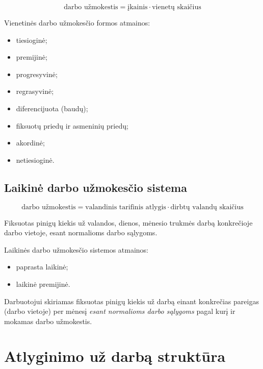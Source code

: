 \begin{equation*}
  \text{darbo užmokestis} = \text{įkainis} \cdot \text{vienetų skaičius}
\end{equation*}

Vienetinės darbo užmokesčio formos atmainos:
\begin{itemize}
  \item tiesioginė;
  \item premijinė;
  \item progresyvinė;
  \item regrasyvinė;
  \item diferencijuota (baudų);
  \item fiksuotų priedų ir asmeninių priedų;
  \item akordinė;
  \item netiesioginė.
\end{itemize}

\subsection{Laikinė darbo užmokesčio sistema}

\begin{equation*}
  \text{darbo užmokestis} =
    \text{valandinis tarifinis atlygis} \cdot \text{dirbtų valandų skaičius}
\end{equation*}

\begin{defn}
  Fiksuotas pinigų kiekis už valandos, dienos, mėnesio trukmės darbą
  konkrečioje darbo vietoje, esant normalioms darbo sąlygoms.
\end{defn}

Laikinės darbo užmokesčio sistemos atmainos:
\begin{itemize}
  \item paprasta laikinė;
  \item laikinė premijinė.
\end{itemize}

\begin{defn}
  Darbuotojui skiriamas fiksuotas pinigų kiekis už darbą einant konkrečias
  pareigas (darbo vietoje) per mėnesį \emph{esant normalioms darbo
  sąlygoms} pagal kurį ir mokamas darbo užmokestis.
\end{defn}

\section{Atlyginimo už darbą struktūra}

